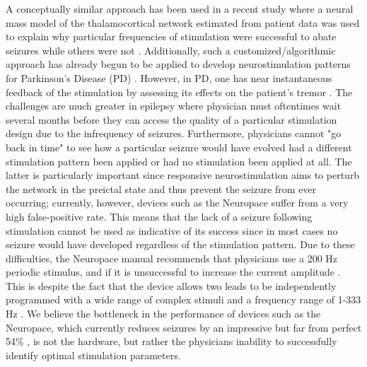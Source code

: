 \documentclass[11pt,a4paper,final]{article}
\begin{document}
A conceptually similar approach has been used in a recent study where a neural mass model of the thalamocortical network estimated from patient data was used to explain why particular frequencies of stimulation were successful to abate seizures while others were not \citep{wendling13}.
Additionally, such a customized/algorithmic approach has already begun to be applied to develop neurostimulation patterns for Parkinson's Disease (PD) \citep{holt14,grill14patent,brocker17}.
However, in PD, one has near instantaneous feedback of the stimulation by assessing its effects on the patient's tremor \citep{grill13}.
The challenges are much greater in epilepsy where physician must oftentimes wait several months before they can access the quality of a particular stimulation design due to the infrequency of seizures.
Furthermore, physicians cannot "go back in time" to see how a particular seizure would have evolved had a different stimulation pattern been applied or had no stimulation been applied at all.
The latter is particularly important since responsive neurostimulation aims to perturb the network in the preictal state and thus prevent the seizure from ever occurring; currently, however, devices such as the Neuropace suffer from a very high false-positive rate.
This means that the lack of a seizure following stimulation cannot be used as indicative of its success since in most cases no seizure would have developed regardless of the stimulation pattern.
Due to these difficulties, the Neuropace manual recommends that physicians use a 200 Hz periodic stimulus, and if it is unsuccessful to increase the current amplitude \citep{NP}.
This is despite the fact that the device allows two leads to be independently programmed with a wide range of complex stimuli and a frequency range of 1-333 Hz \citep{sun08}.
We believe the bottleneck in the performance of devices such as the Neuropace, which currently reduces seizures by an impressive but far from perfect 54\% \citep{heck14}, is not the hardware, but rather the physicians inability to successfully identify optimal stimulation parameters.
\end{document}
